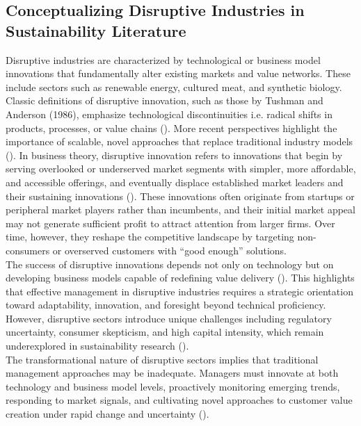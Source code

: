 	\subsection{Conceptualizing Disruptive Industries in Sustainability Literature}
	Disruptive industries are characterized by technological or business model innovations that fundamentally alter existing markets and value networks. These include sectors such as renewable energy, cultured meat, and synthetic biology. Classic definitions of disruptive innovation, such as those by Tushman and Anderson (1986), emphasize technological discontinuities i.e. radical shifts in products, processes, or value chains (\textcite{Tushman1986}). More recent perspectives highlight the importance of scalable, novel approaches that replace traditional industry models (\textcite{Yu2010}). In business theory, disruptive innovation refers to innovations that begin by serving overlooked or underserved market segments with simpler, more affordable, and accessible offerings, and eventually displace established market leaders and their sustaining innovations (\textcite{Christensen1997}). These innovations often originate from startups or peripheral market players rather than incumbents, and their initial market appeal may not generate sufficient profit to attract attention from larger firms. Over time, however, they reshape the competitive landscape by targeting non-consumers or overserved customers with “good enough” solutions. \\
	
	The success of disruptive innovations depends not only on technology but on developing business models capable of redefining value delivery (\textcite{Chesbrough2007}). This highlights that effective management in disruptive industries requires a strategic orientation toward adaptability, innovation, and foresight beyond technical proficiency. However, disruptive sectors introduce unique challenges including regulatory uncertainty, consumer skepticism, and high capital intensity, which remain underexplored in sustainability research (\textcite{Wustenhagen2007}). \\
	
	The transformational nature of disruptive sectors implies that traditional management approaches may be inadequate. Managers must innovate at both technology and business model levels, proactively monitoring emerging trends, responding to market signals, and cultivating novel approaches to customer value creation under rapid change and uncertainty (\textcite{Teece2007}).\\
	
